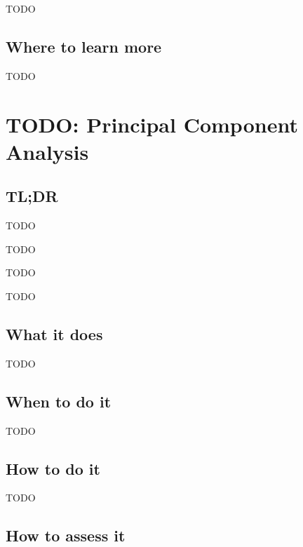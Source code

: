 \documentclass[
]{book}
\providecommand{\tightlist}{%
  \setlength{\itemsep}{0pt}\setlength{\parskip}{0pt}}
\begin{document}
TODO

\hypertarget{where-to-learn-more-20}{%
\section{Where to learn more}\label{where-to-learn-more-20}}

TODO

\hypertarget{principal-component-analysis}{%
\chapter{TODO: Principal Component Analysis}\label{principal-component-analysis}}

\hypertarget{tldr-21}{%
\section{TL;DR}\label{tldr-21}}

\begin{description}
\tightlist
\item[What it does]
TODO
\item[When to do it]
TODO
\item[How to do it]
TODO
\item[How to assess it]
TODO
\end{description}

\hypertarget{what-it-does-21}{%
\section{What it does}\label{what-it-does-21}}

TODO

\hypertarget{when-to-do-it-21}{%
\section{When to do it}\label{when-to-do-it-21}}

TODO

\hypertarget{how-to-do-it-21}{%
\section{How to do it}\label{how-to-do-it-21}}

TODO

\hypertarget{how-to-assess-it-21}{%
\section{How to assess it}\label{how-to-assess-it-21}}
\end{document}
